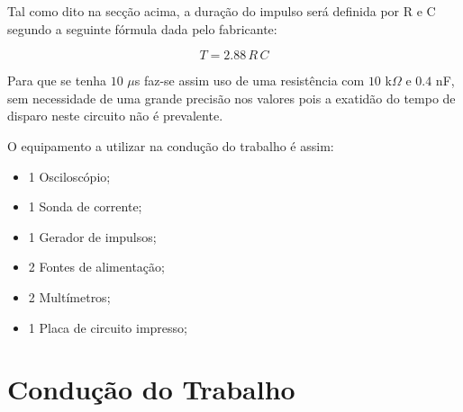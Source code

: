 \documentclass[a4paper,11pt]{article}
\begin{document}
	Tal como dito na secção acima, a duração do impulso será definida por R e C segundo a seguinte fórmula dada pelo fabricante:
	
	$$ T = 2.88 \, R \, C $$
	
	Para que se tenha $10$ $\mu$s faz-se assim uso de uma resistência com $10$ k$\Omega$ e $0.4$ nF, sem necessidade de uma grande precisão nos valores pois a exatidão do tempo de disparo neste circuito não é prevalente.
	
	O equipamento a utilizar na condução do trabalho é assim:
	
	\begin{itemize}
	\item 1 Osciloscópio;
	\item 1 Sonda de corrente;
	\item 1 Gerador de impulsos;
	\item 2 Fontes de alimentação;
	\item 2 Multímetros;
	\item 1 Placa de circuito impresso;
	\end{itemize}
	
	\section{Condução do Trabalho}
\end{document}
